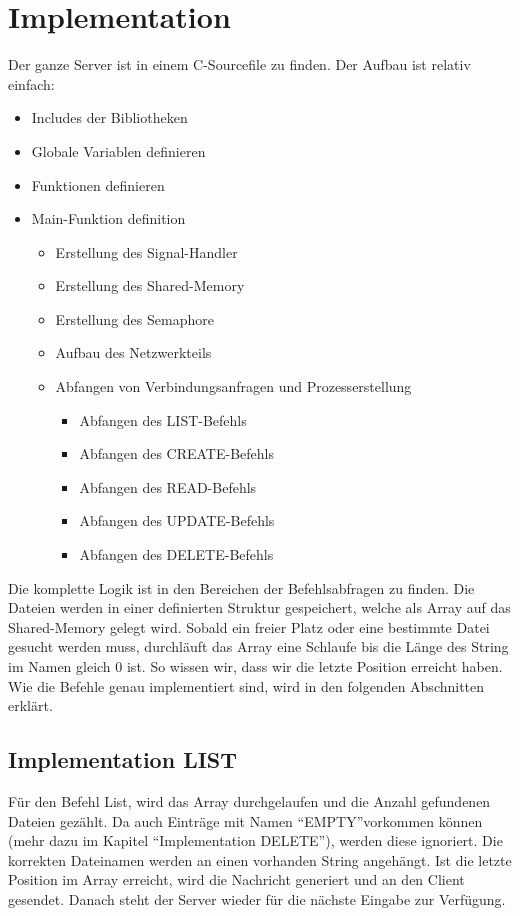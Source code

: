 \documentclass[12pt,a4paper,ngerman]{report}
\begin{document}
\section{Implementation}
Der ganze Server ist in einem C-Sourcefile zu finden. Der Aufbau ist relativ einfach:
\begin{itemize}
	\item Includes der Bibliotheken
	\item Globale Variablen definieren
	\item Funktionen definieren
	\item Main-Funktion definition
		\begin{itemize}
		\item Erstellung des Signal-Handler
		\item Erstellung des Shared-Memory
		\item Erstellung des Semaphore
		\item Aufbau des Netzwerkteils
		\item Abfangen von Verbindungsanfragen und Prozesserstellung
			\begin{itemize}
			\item Abfangen des LIST-Befehls
			\item Abfangen des CREATE-Befehls
			\item Abfangen des READ-Befehls
			\item Abfangen des UPDATE-Befehls
			\item Abfangen des DELETE-Befehls
			\end{itemize}
		\end{itemize}
\end{itemize}
Die komplette Logik ist in den Bereichen der Befehlsabfragen zu finden. Die Dateien werden in einer definierten Struktur gespeichert, welche als Array auf das Shared-Memory gelegt wird. Sobald ein freier Platz oder eine bestimmte Datei gesucht werden muss, durchläuft das Array eine Schlaufe bis die Länge des String im Namen gleich 0 ist. So wissen wir, dass wir die letzte Position erreicht haben. Wie die Befehle genau implementiert sind, wird in den folgenden Abschnitten erklärt.
\subsection{Implementation LIST}
Für den Befehl List, wird das Array durchgelaufen und die Anzahl gefundenen Dateien gezählt. Da auch Einträge mit Namen \textquotedblleft EMPTY\textquotedblright vorkommen können (mehr dazu im Kapitel \textquotedblleft Implementation DELETE\textquotedblright), werden diese ignoriert. Die korrekten Dateinamen werden an einen vorhanden String angehängt. Ist die letzte Position im Array erreicht, wird die Nachricht generiert und an den Client gesendet. Danach steht der Server wieder für die nächste Eingabe zur Verfügung.
\end{document}
